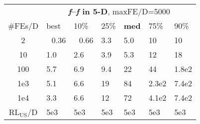 \begin{tabular}{c|llllll}
 & \multicolumn{6}{|c}{\textbf{\textit{f}\raisebox{-0.35ex}{1}--\textit{f}\raisebox{-0.35ex}{24} in 5-D}, maxFE/D=5000}\\
\#FEs/D & best & 10\% & 25\% & \textbf{med} & 75\% & 90\%\\
2 & ~\,0.36 & ~\,0.66 & \hspace*{1ex}3.3 & \hspace*{1ex}5.0 & 10 & 10\\
10 & \hspace*{1ex}1.0 & \hspace*{1ex}2.6 & \hspace*{1ex}3.9 & \hspace*{1ex}5.3 & 12 & 18\\
100 & \hspace*{1ex}5.7 & \hspace*{1ex}6.9 & \hspace*{1ex}9.4 & 22 & 44 & 1.8e2\\
1e3 & \hspace*{1ex}5.1 & \hspace*{1ex}6.6 & 19 & 84 & 2.3e2 & 7.4e2\\
1e4 & \hspace*{1ex}3.3 & \hspace*{1ex}6.6 & 12 & 72 & 4.1e2 & 7.4e2\\
$\text{RL}_{\text{US}}$/D & 5e3 & 5e3 & 5e3 & 5e3 & 5e3 & 5e3
\end{tabular}
